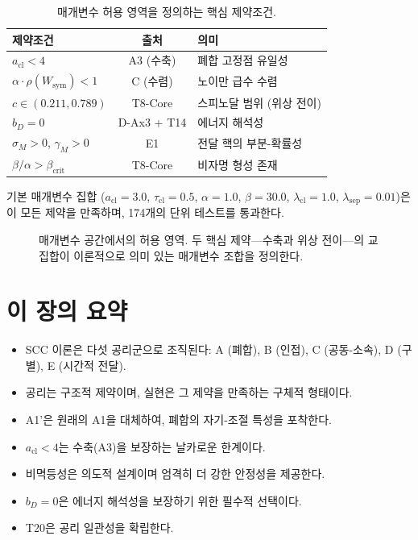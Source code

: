 \begin{table}[h]
\centering
\begin{tabular}{lcl}
\hline
\textbf{제약조건} & \textbf{출처} & \textbf{의미} \\
\hline
$a_{\mathrm{cl}} < 4$ & A3 (수축) & 폐합 고정점 유일성 \\
$\alpha \cdot \rho(W_{\mathrm{sym}}) < 1$ & C (수렴) & 노이만 급수 수렴 \\
$c \in (0.211, 0.789)$ & T8-Core & 스피노달 범위 (위상 전이) \\
$b_D = 0$ & D-Ax3 + T14 & 에너지 해석성 \\
$\sigma_M > 0$, $\gamma_M > 0$ & E1 & 전달 핵의 부분-확률성 \\
$\beta/\alpha > \beta_{\mathrm{crit}}$ & T8-Core & 비자명 형성 존재 \\
\hline
\end{tabular}
\caption{매개변수 허용 영역을 정의하는 핵심 제약조건.}
\label{tab:parameter-admissibility}
\end{table}

기본 매개변수 집합 ($a_{\mathrm{cl}} = 3.0$, $\tau_{\mathrm{cl}} = 0.5$, $\alpha = 1.0$, $\beta = 30.0$, $\lambda_{\mathrm{cl}} = 1.0$, $\lambda_{\mathrm{sep}} = 0.01$)은 이 모든 제약을 만족하며, 174개의 단위 테스트를 통과한다.

\begin{figure}[t]
\centering
\caption{매개변수 공간에서의 허용 영역. 두 핵심 제약---수축과 위상 전이---의 교집합이 이론적으로 의미 있는 매개변수 조합을 정의한다.}
\label{fig:parameter-space}
\end{figure}


\section*{이 장의 요약}

\begin{itemize}
    \item SCC 이론은 다섯 공리군으로 조직된다: A (폐합), B (인접), C (공동-소속), D (구별), E (시간적 전달).
    \item 공리는 구조적 제약이며, 실현은 그 제약을 만족하는 구체적 형태이다.
    \item A1'은 원래의 A1을 대체하여, 폐합의 자기-조절 특성을 포착한다.
    \item $a_{\mathrm{cl}} < 4$는 수축(A3)을 보장하는 날카로운 한계이다.
    \item 비멱등성은 의도적 설계이며 엄격히 더 강한 안정성을 제공한다.
    \item $b_D = 0$은 에너지 해석성을 보장하기 위한 필수적 선택이다.
    \item T20은 공리 일관성을 확립한다.
\end{itemize}
